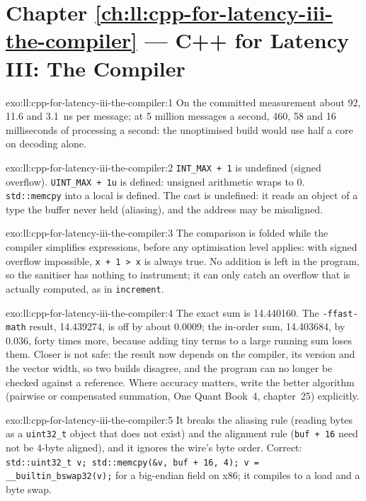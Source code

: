 \section*{Chapter \ref{ch:ll:cpp-for-latency-iii-the-compiler} --- C++ for Latency III: The Compiler}

\begin{solution}{exo:ll:cpp-for-latency-iii-the-compiler:1}
On the committed measurement about 92, 11.6 and \qty{3.1}{\nano\second} per message; at 5 million messages a second, 460,
58 and 16 milliseconds of processing a second: the unoptimised build would use half a core on decoding alone.
\end{solution}

\begin{solution}{exo:ll:cpp-for-latency-iii-the-compiler:2}
\texttt{INT\_MAX + 1} is undefined (signed overflow). \texttt{UINT\_MAX + 1u} is defined: unsigned arithmetic wraps to 0.
\texttt{std::memcpy} into a local is defined. The cast is undefined: it reads an object of a type the buffer never held
(aliasing), and the address may be misaligned.
\end{solution}

\begin{solution}{exo:ll:cpp-for-latency-iii-the-compiler:3}
The comparison is folded while the compiler simplifies expressions, before any optimisation level applies: with signed
overflow impossible, \texttt{x + 1 > x} is always true. No addition is left in the program, so the sanitiser has nothing
to instrument; it can only catch an overflow that is actually computed, as in \texttt{increment}.
\end{solution}

\begin{solution}{exo:ll:cpp-for-latency-iii-the-compiler:4}
The exact sum is 14.440160. The \texttt{-ffast-math} result, 14.439274, is off by about 0.0009; the in-order sum, 14.403684,
by 0.036, forty times more, because adding tiny terms to a large running sum loses them. Closer is not safe: the result now
depends on the compiler, its version and the vector width, so two builds disagree, and the program can no longer be checked
against a reference. Where accuracy matters, write the better algorithm (pairwise or compensated summation, One Quant
Book~4, chapter~25) explicitly.
\end{solution}

\begin{solution}{exo:ll:cpp-for-latency-iii-the-compiler:5}
It breaks the aliasing rule (reading bytes as a \texttt{uint32\_t} object that does not exist) and the alignment rule
(\texttt{buf + 16} need not be 4-byte aligned), and it ignores the wire's byte order. Correct: \texttt{std::uint32\_t v;
std::memcpy(\&v, buf + 16, 4); v = \_\_builtin\_bswap32(v);} for a big-endian field on x86; it compiles to a load and a
byte swap.
\end{solution}

